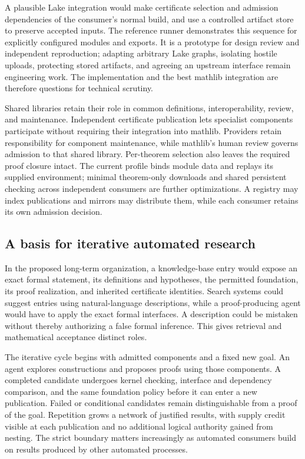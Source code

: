\documentclass[11pt]{article}
\begin{document}
A plausible Lake integration would make certificate selection and admission
dependencies of the consumer's normal build, and use a controlled artifact
store to preserve accepted inputs. The reference runner demonstrates this
sequence for explicitly configured modules and exports. It is a prototype for
design review and independent reproduction; adapting arbitrary Lake graphs,
isolating hostile uploads, protecting stored artifacts, and agreeing an
upstream interface remain engineering work. The implementation and the best
mathlib integration are therefore questions for technical scrutiny.

Shared libraries retain their role in common definitions, interoperability,
review, and maintenance. Independent certificate publication lets specialist
components participate without requiring their integration into mathlib.
Providers retain responsibility for component maintenance, while mathlib's
human review governs admission to that shared library. Per-theorem
selection also leaves the required proof closure intact. The current profile
binds module data and replays its supplied environment; minimal theorem-only
downloads and shared persistent checking across independent consumers are
further optimizations. A registry may index publications and mirrors may
distribute them, while each consumer retains its own admission decision.

\subsection{A basis for iterative automated research}

In the proposed long-term organization, a knowledge-base entry would expose
an exact formal statement, its definitions and hypotheses, the permitted
foundation, its proof realization, and inherited certificate identities. Search
systems could suggest entries using natural-language descriptions, while a
proof-producing agent would have to apply the exact formal interfaces. A
description could be mistaken without thereby authorizing a false formal
inference. This gives retrieval and mathematical acceptance distinct roles.

The iterative cycle begins with admitted components and a fixed new goal. An
agent explores constructions and proposes proofs using those components. A
completed candidate undergoes kernel checking, interface and dependency
comparison, and the same foundation policy before it can enter a new
publication. Failed or conditional candidates remain distinguishable from a
proof of the goal. Repetition grows a network of justified results, with supply
credit visible at each publication and no additional logical authority gained
from nesting. The strict boundary matters increasingly as automated consumers
build on results produced by other automated processes.
\end{document}
